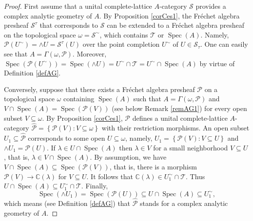 \documentclass[12pt]{amsart}%
\theoremstyle{plain}
\numberwithin{equation}{section}
\numberwithin{equation}{section}
\numberwithin{theorem}{section}
\numberwithin{lemma}{section}
\numberwithin{remark}{section}
\numberwithin{example}{section}
\numberwithin{proposition}{section}
\numberwithin{definition}{section}
\numberwithin{corollary}{section}
\begin{document}
\begin{proof}
First assume that a unital complete-lattice $A$-category $\mathcal{S}$
provides a complex analytic geometry of $A$. By Proposition \ref{corCes1}, the
Fr\'{e}chet algebra presheaf $\mathcal{S}^{\tau}$ that corresponds to
$\mathcal{S}$ can be extended to a Fr\'{e}chet algebra presheaf on the
topological space $\omega=\mathcal{S}^{\sim}$, which contains $\mathcal{T}$ or
$\operatorname{Spec}\left(  A\right)  $. Namely, $\mathcal{P}\left(  U^{\sim
}\right)  =\wedge U=\mathcal{S}^{\tau}\left(  U\right)  $ over the point
completion $U^{\sim}$ of $U\in\mathcal{S}_{\tau}$. One can easily see that
$A=\Gamma\left(  \omega,\mathcal{P}\right)  $. Moreover, $\operatorname{Spec}%
\left(  \mathcal{P}\left(  U^{\sim}\right)  \right)  =\operatorname{Spec}%
\left(  \wedge U\right)  =U^{\sim}\cap\mathcal{T}=U^{\sim}\cap
\operatorname{Spec}\left(  A\right)  $ by virtue of Definition \ref{defAG}.

Conversely, suppose that there exists a Fr\'{e}chet algebra presheaf
$\mathcal{P}$ on a topological space $\omega$ containing $\operatorname{Spec}%
\left(  A\right)  $ such that $A=\Gamma\left(  \omega,\mathcal{P}\right)  $
and $V\cap\operatorname{Spec}\left(  A\right)  =\operatorname{Spec}\left(
\mathcal{P}\left(  V\right)  \right)  $ (see below Remark \ref{remAG1}) for
every open subset $V\subseteq\omega$. By Proposition \ref{corCes1},
$\mathcal{P}$ defines a unital complete-lattice $A$-category
$\widehat{\mathcal{P}}=\left\{  \mathcal{P}\left(  V\right)  :V\subseteq
\omega\right\}  $ with their restriction morphisms. An open subset
$U_{1}\subseteq\widehat{\mathcal{P}}$ corresponds to some open $U\subseteq
\omega$, namely, $U_{1}=\left\{  \mathcal{P}\left(  V\right)  :V\subseteq
U\right\}  $ and $\wedge U_{1}=\mathcal{P}\left(  U\right)  $. If $\lambda\in
U\cap\operatorname{Spec}\left(  A\right)  $ then $\lambda\in V$ for a small
neighborhood $V\subseteq U$, that is, $\lambda\in V\cap\operatorname{Spec}%
\left(  A\right)  $. By assumption, we have $V\cap\operatorname{Spec}\left(
A\right)  \subseteq\operatorname{Spec}\left(  \mathcal{P}\left(  V\right)
\right)  $, that is, there is a morphism $\mathcal{P}\left(  V\right)
\rightarrow\mathbb{C}\left(  \lambda\right)  $ for $V\subseteq U$. It follows
that $\mathbb{C}\left(  \lambda\right)  \in U_{1}^{\sim}\cap\mathcal{T}$. Thus
$U\cap\operatorname{Spec}\left(  A\right)  \subseteq U_{1}^{\sim}%
\cap\mathcal{T}$. Finally,
\[
\operatorname{Spec}\left(  \wedge U_{1}\right)  =\operatorname{Spec}\left(
\mathcal{P}\left(  U\right)  \right)  \subseteq U\cap\operatorname{Spec}%
\left(  A\right)  \subseteq U_{1}^{\sim},
\]
which means (see Definition \ref{defAG}) that $\widehat{\mathcal{P}}$ stands
for a complex analytic geometry of $A$.
\end{proof}
\end{document}
